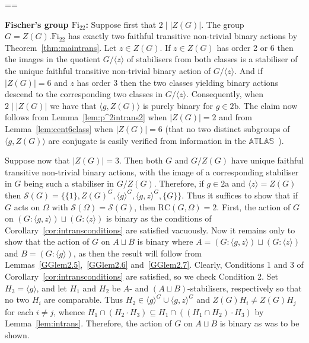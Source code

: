 \documentclass[11pt, a4paper]{amsart}
\makeatletter
\renewcommand{\proofname}{Proof}
\renewenvironment{proof}[1][\proofname]{\par
  \pushQED{\qed}  \normalfont \partopsep=\z@skip \topsep=\z@skip
  \trivlist
  \item[\hskip\labelsep
        \scshape
    #1\@addpunct{.}]\ignorespaces
}{  \popQED\endtrivlist\@endpefalse
}
\makeatother
\begin{document}
\begin{proof}[Proof of Theorem~\ref{thm:main}]
    \textbf{Fischer's group $\mathrm{Fi}_{22}$:} Suppose first that $2\mid |Z(G)|$. The group $G=Z(G).\mathrm{Fi}_{22}$ has exactly two faithful transitive non-trivial binary actions by Theorem~\ref{thm:maintrans}. Let $z\in Z(G)$. If $z\in Z(G)$ has order 2 or 6 then the images in the quotient $G/\langle z\rangle$ of stabilisers from both classes is a stabiliser of the unique faithful transitive non-trivial binary action of $G/\langle z\rangle$. And if $|Z(G)|=6$ and $z$ has order 3 then the two classes yielding binary actions descend to the corresponding two classes in $G/\langle z\rangle$. Consequently, when $2\mid |Z(G)|$ we have that $\langle g,Z(G)\rangle$ is purely binary for $g\in\mathrm{2b}$. The claim now follows from Lemma~\ref{lem:p^2intrans2} when $|Z(G)|=2$ and from Lemma~\ref{lem:cent6class} when $|Z(G)|=6$ (that no two distinct subgroups of $\langle g,Z(G)\rangle$ are conjugate is easily verified from information in the $\mathbb{ATLAS}$~\cite{atlas}). 

    Suppose now that $|Z(G)|=3$. Then both $G$ and $G/Z(G)$ have unique faithful transitive non-trivial binary actions, with the image of a corresponding stabiliser in $G$ being such a stabiliser in $G/Z(G)$. Therefore, if $g\in\mathrm{2a}$ and $\langle z\rangle =Z(G)$ then $\mathcal{S}(G)=\{\{1\},Z(G)^G,\langle g\rangle^G,\langle g,z\rangle^G,\{G\}\}$. Thus it suffices to show that if $G$ acts on $\Omega$ with $\mathcal{S}(\Omega)=\mathcal{S}(G)$, then $\mathrm{RC}(G,\Omega)=2$. First, the action of $G$ on $(G:\langle g,z\rangle)\sqcup(G:\langle z\rangle)$ is binary as the conditions of Corollary~\ref{cor:intransconditions} are satisfied vacuously. Now it remains only to show that the action of $G$ on $A\sqcup B$ is binary where $A=(G:\langle g,z\rangle)\sqcup(G:\langle z\rangle)$ and $B=(G:\langle g\rangle)$, as then the result will follow from Lemmas~\ref{GGlem2.5},~\ref{GGlem2.6} and~\ref{GGlem2.7}. Clearly, Conditions 1 and 3 of Corollary~\ref{cor:intransconditions} are satisfied, so we check Condition 2. Set $H_3=\langle g\rangle$, and let $H_1$ and $H_2$ be $A$- and $(A\sqcup B)$-stabilisers, respectively so that no two $H_i$ are comparable. Thus $H_2\in\langle g\rangle^G\cup\langle g,z\rangle^G$ and  $Z(G)H_i\ne Z(G)H_j$ for each $i\ne j$, whence $H_1\cap (H_2\cdot H_3)\subseteq H_1\cap ((H_1\cap H_2)\cdot H_3)$ by Lemma~\ref{lem:intrans}. Therefore, the action of $G$ on $A\sqcup B$ is binary as was to be shown.
\end{proof}
        

  

\end{document}
